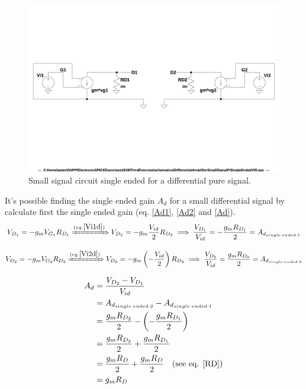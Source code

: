 \documentclass[10pt,a4paper]{book}
\begin{document}
\begin{figure}[h]
  \centering
  \includegraphics[width=12cm]{schematics/DifferentialAmplifierSmallSignalPiSingleEndedVID.jpg}
  \caption{Small signal circuit single ended for a differential pure signal.}
  \label{PiSingle2}
\end{figure}

It's possible finding the single ended gain $A_d$ for a small differential signal by calculate first the single ended gain (eq. \ref{Ad1}, \ref{Ad2} and \ref{Ad}).\\

\begin{align}
V_{D_1} = - g_m V_{G_1} R_{D_1} \xRightarrow{(eq. \ref{Vi1d})}
V_{D_2} = - g_m \frac{V_{id}}{2} R_{D_2} \implies
\frac{V_{D_1}}{V_{id}} = - \frac{g_m R_{D_1}}{2} = A_{d_{single\cdot ended\cdot 1}}\label{Ad1}
\end{align}

\begin{align}
V_{D_2} = - g_m V_{G_2} R_{D_2} \xRightarrow{(eq. \ref{Vi2d})}
V_{D_2} = - g_m \left(-\frac{V_{id}}{2}\right) R_{D_2} \implies
\frac{V_{D_2}}{V_{id}} = \frac{g_m R_{D_2}}{2} = A_{d_{single\cdot ended\cdot 2}}\label{Ad2}
\end{align}

\begin{align}
A_d &= \frac{V_{D_2} - V_{D_1}}{V_{id}}\\
&= A_{d_{single\cdot ended\cdot 2}} - A_{d_{single\cdot ended\cdot 1}}\\
&= \frac{g_m R_{D_2}}{2} - \left(- \frac{g_m R_{D_1}}{2} \right)\\
&= \frac{g_m R_{D_2}}{2} + \frac{g_m R_{D_1}}{2}\\
&= \frac{g_m R_{D}}{2} + \frac{g_m R_{D}}{2} \quad \text{(see eq. \ref{RD})}\\
&= g_m R_{D} \label{Ad}
\end{align}
\end{document}
